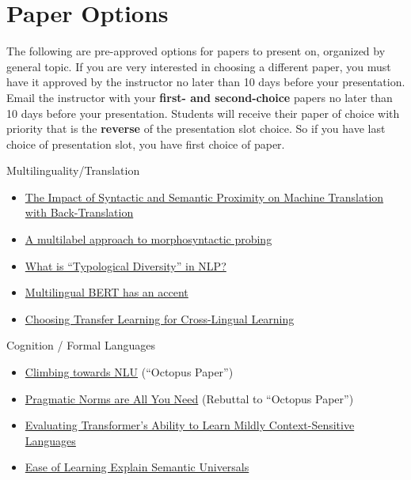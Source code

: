 \documentclass[11pt]{article}
\begin{document}
\section*{Paper Options}
The following are pre-approved options for papers to present on, organized by general topic. If you are very interested in choosing a different paper, you must have it approved by the instructor no later than 10 days before your presentation. Email the instructor with your \textbf{first- and second-choice} papers no later than 10 days before your presentation. Students will receive their paper of choice with priority that is the \textbf{reverse} of the presentation slot choice. So if you have last choice of presentation slot, you have first choice of paper.

Multilinguality/Translation
\begin{itemize}
 \item \href{https://arxiv.org/abs/2403.18031}{The Impact of Syntactic and Semantic Proximity on Machine Translation with Back-Translation}
 \item \href{https://aclanthology.org/2021.findings-emnlp.382/}{A multilabel approach to morphosyntactic probing}
 \item \href{https://aclanthology.org/2024.emnlp-main.326/}{What is ``Typological Diversity'' in NLP?}
 \item \href{https://aclanthology.org/2023.findings-eacl.89/}{Multilingual BERT has an accent}
 \item \href{https://aclanthology.org/P19-1301/}{Choosing Transfer Learning for Cross-Lingual Learning}
\end{itemize}

Cognition / Formal Languages
\begin{itemize}
  \item \href{https://aclanthology.org/2020.acl-main.463/}{Climbing towards NLU} (``Octopus Paper'')
  \item \href{https://aclanthology.org/2024.emnlp-main.651/}{Pragmatic Norms are All You Need} (Rebuttal to ``Octopus Paper'')
  \item \href{https://aclanthology.org/2023.blackboxnlp-1.21/}{Evaluating Transformer's Ability to Learn Mildly Context-Sensitive Languages}
  \item \href{https://www.sciencedirect.com/science/article/pii/S0010027719302495}{Ease of Learning Explain Semantic Universals}
\end{itemize}
\end{document}
